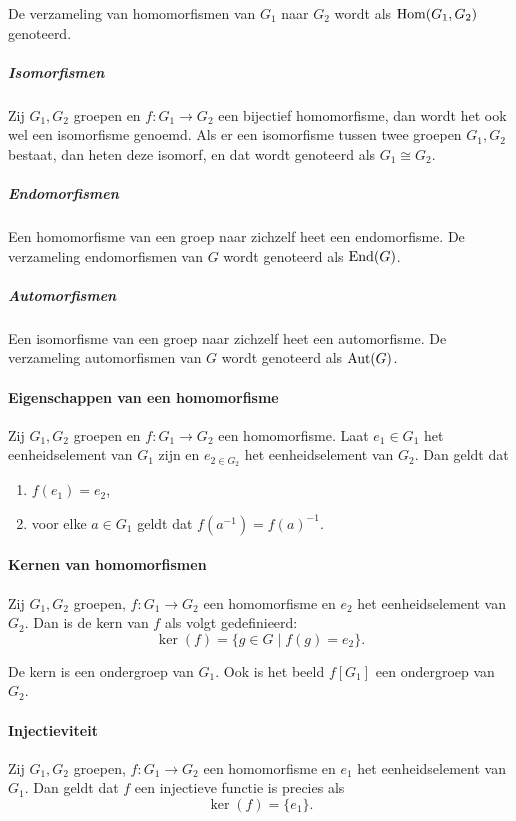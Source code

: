 De verzameling van homomorfismen van \(G_{1}\) naar \(G_{2}\) wordt als \(\operatorname{Hom}(G_{1},G_{2})\) genoteerd.

\subparagraph{Isomorfismen} Zij \(G_{1},G_{2}\) groepen en \(f\colon G_{1}\to G_{2}\) een bijectief homomorfisme, dan wordt het ook wel een isomorfisme genoemd. Als er een isomorfisme tussen twee groepen \(G_{1},G_{2}\) bestaat, dan heten deze isomorf, en dat wordt genoteerd als \(G_{1}\cong G_{2}\).

\subparagraph{Endomorfismen} Een homomorfisme van een groep naar zichzelf heet een endomorfisme. De verzameling endomorfismen van \(G\) wordt genoteerd als \(\operatorname{End}(G)\).

\subparagraph{Automorfismen} Een isomorfisme van een groep naar zichzelf heet een automorfisme. De verzameling automorfismen van \(G\) wordt genoteerd als \(\operatorname{Aut}(G)\).

\paragraph{Eigenschappen van een homomorfisme} Zij \(G_{1},G_{2}\) groepen en \(f\colon G_{1}\to G_{2}\) een homomorfisme. Laat \(e_{1}\in G_{1}\) het eenheidselement van \(G_{1}\) zijn en \(e_{2\in G_{2}}\) het eenheidselement van \(G_{2}\). Dan geldt dat
\begin{enumerate}
    \item \(f(e_{1})=e_{2}\),
    \item voor elke \(a\in G_{1}\) geldt dat \(f(a^{-1})=f(a)^{-1}\).
\end{enumerate}

\paragraph{Kernen van homomorfismen} Zij \(G_{1},G_{2}\) groepen, \(f\colon G_{1}\to G_{2}\) een homomorfisme en \(e_{2}\) het eenheidselement van \(G_{2}\). Dan is de kern van \(f\) als volgt gedefinieerd:
\[
    \ker(f)=\{g\in G\mid f(g)=e_{2}\}.
\]

De kern is een ondergroep van \(G_{1}\). Ook is het beeld \(f[G_{1}]\) een ondergroep van \(G_{2}\).

\paragraph{Injectieviteit} Zij \(G_{1},G_{2}\) groepen, \(f\colon G_{1}\to G_{2}\) een homomorfisme en \(e_{1}\) het eenheidselement van \(G_{1}\). Dan geldt dat \(f\) een injectieve functie is precies als
\[
    \ker(f)=\{e_{1}\}.
\]

